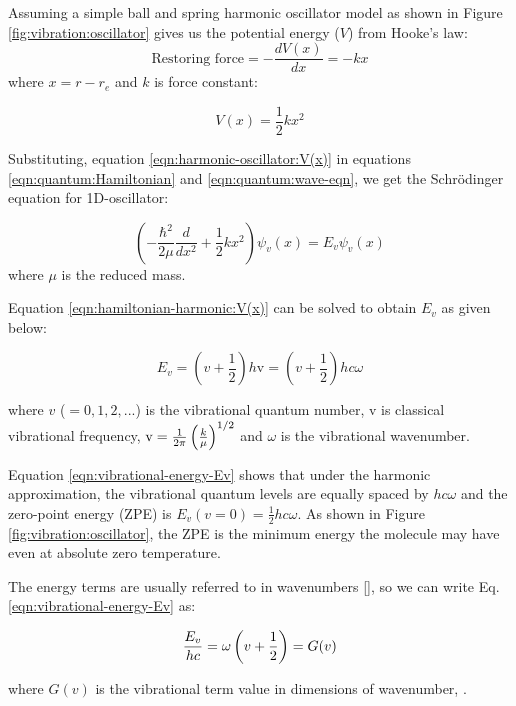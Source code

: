Assuming a simple ball and spring harmonic oscillator model as shown in Figure \ref{fig:vibration:oscillator} gives us the potential energy ($V$) from Hooke's law:
\[\text{Restoring force} = - \frac{dV(x)}{dx} = -kx\]
where $x=r-r_e$ and $k$ is force constant:

\begin{equation}
    \label{eqn:harmonic-oscillator:V(x)}
    V(x) = \frac{1}{2} k x^2
\end{equation}

Substituting, equation \ref{eqn:harmonic-oscillator:V(x)} in equations \ref{eqn:quantum:Hamiltonian} and \ref{eqn:quantum:wave-eqn}, we get the Schr\"odinger equation for 1D-oscillator:

\begin{equation}
    \label{eqn:hamiltonian-harmonic:V(x)}
    \left( -\frac{\hbar^2}{2\mu} \frac{d}{d x^2} + \frac{1}{2} k x^2 \right ) \psi_v(x) = E_v\psi_v(x)
\end{equation}
where $\mu$ is the reduced mass.

Equation \ref{eqn:hamiltonian-harmonic:V(x)} can be solved to obtain $E_v$ as given below:

\begin{equation}
    \label{eqn:vibrational-energy-Ev}
    E_v = \left( v + \frac{1}{2} \right) h \text{v} = \left( v + \frac{1}{2} \right) hc\omega
\end{equation}

where $v$ ($=0, 1, 2, ...$) is the vibrational quantum number, v is classical vibrational frequency, $\text{v}=\frac{1}{2\pi}\left( \frac{k}{\mu} \right)^{1/2}$ and $\omega$ is the vibrational wavenumber.


Equation \ref{eqn:vibrational-energy-Ev} shows that under the harmonic approximation, the vibrational quantum levels are equally spaced by $hc\omega$ and the zero-point energy (ZPE) is $E_v(v=0)=\frac{1}{2} hc\omega$. As shown in Figure \ref{fig:vibration:oscillator}, the ZPE is the minimum energy the molecule may have even at absolute zero temperature.

The energy terms are usually referred to in wavenumbers [\wn], so we can write Eq. \ref{eqn:vibrational-energy-Ev} as:

\begin{equation}
    \label{eqn:Ev-Gv}
    \frac{E_v}{hc} = \omega \left( v + \frac{1}{2} \right) = G(v)
\end{equation}

where $G(v)$ is the vibrational term value in dimensions of wavenumber, \wn.


